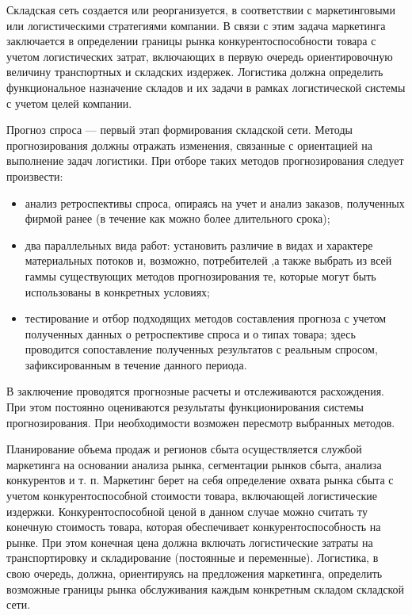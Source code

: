 Складская сеть создается или реорганизуется, в соответствии с маркетинговыми или логистическими стратегиями компании.
В связи с этим задача маркетинга заключается в определении границы рынка конкурентоспособности товара с учетом логистических затрат, включающих в первую очередь ориентировочную величину транспортных и складских издержек.
Логистика должна определить функциональное назначение складов и их задачи в рамках логистической системы с учетом целей компании.

Прогноз спроса --- первый этап формирования складской сети.
Методы прогнозирования должны отражать изменения, связанные с ориентацией на выполнение задач логистики.
При отборе таких методов прогнозирования следует произвести:
\begin{itemize}
	\item анализ ретроспективы спроса, опираясь на учет и анализ заказов, полученных фирмой ранее (в течение как можно более длительного срока);
	\item два параллельных вида работ: установить различие в видах и характере материальных потоков и, возможно, потребителей ,а также выбрать из всей гаммы существующих методов прогнозирования те, которые могут быть использованы в конкретных условиях;
	\item тестирование и отбор подходящих методов составления прогноза с учетом полученных данных о ретроспективе спроса и о типах товара; здесь проводится сопоставление полученных результатов с реальным спросом, зафиксированным в течение данного периода.
\end{itemize}

В заключение проводятся прогнозные расчеты и отслеживаются расхождения.
При этом постоянно оцениваются результаты функционирования системы прогнозирования.
При необходимости возможен пересмотр выбранных методов.

Планирование объема продаж и регионов сбыта осуществляется службой маркетинга на основании анализа рынка, сегментации рынков сбыта, анализа конкурентов и т. п.
Маркетинг берет на себя определение охвата рынка сбыта с учетом конкурентоспособной стоимости товара, включающей логистические издержки.
Конкурентоспособной ценой в данном случае можно считать ту конечную стоимость товара, которая обеспечивает конкурентоспособность на рынке.
При этом конечная цена должна включать логистические затраты на транспортировку и складирование (постоянные и переменные).
Логистика, в свою очередь, должна, ориентируясь на предложения маркетинга, определить возможные границы рынка обслуживания каждым конкретным складом складской сети.

